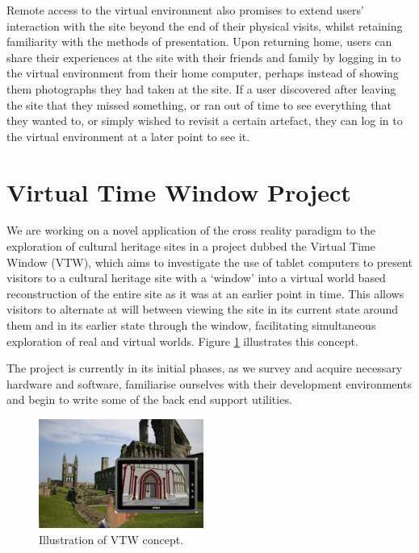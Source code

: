 \documentclass{sig-alternate}
\begin{document}
{Remote access to the virtual environment also promises to extend users' interaction with the site beyond the end of their physical visits, whilst retaining familiarity with the methods of presentation. Upon returning home, users can share their experiences at the site with their friends and family by logging in to the virtual environment from their home computer, perhaps instead of showing them photographs they had taken at the site. If a user discovered after leaving the site that they missed something, or ran out of time to see everything that they wanted to, or simply wished to revisit a certain artefact, they can log in to the virtual environment at a later point to see it.

\section{Virtual Time Window Project}
\label{sec:vtwintro}
We are working on a novel application of the cross reality paradigm to the exploration of cultural heritage sites in a project dubbed the Virtual Time Window (VTW), which aims to investigate the use of tablet computers to present visitors to a cultural heritage site with a `window' into a virtual world based reconstruction of the entire site as it was at an earlier point in time. This allows visitors to alternate at will between viewing the site in its current state around them and in its earlier state through the window, facilitating simultaneous exploration of real and virtual worlds. Figure \ref{vtwmockup} illustrates this concept.

The project is currently in its initial phases, as we survey and acquire necessary hardware and software, familiarise ourselves with their development environments and begin to write some of the back end support utilities.

\begin{figure}[]
\centering
\includegraphics[width=0.48\textwidth]{mockup.jpg}
\caption{Illustration of VTW concept.}
\label{vtwmockup}
\end{figure}

}
\end{document}
